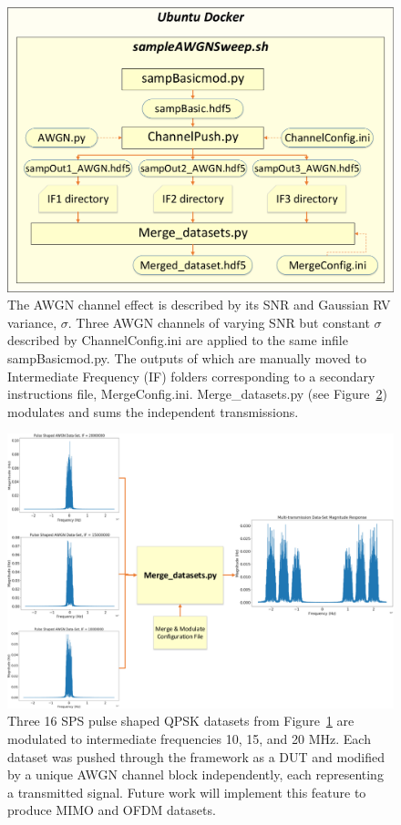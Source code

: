 \begin{figure}[ht!]
\centering	\includegraphics[width=1\textwidth,keepaspectratio]{figs/bashcmd_poster.eps}
    \caption{The AWGN channel effect is described by its SNR and Gaussian RV variance, $\sigma$. Three AWGN channels of varying SNR but constant $\sigma$ described by ChannelConfig.ini are applied to the same infile sampBasicmod.py. The outputs of which are manually moved to Intermediate Frequency (IF) folders corresponding to a secondary instructions file, MergeConfig.ini. Merge\_datasets.py (see Figure~\ref{fig:merge/}) modulates and sums the independent transmissions.} 
\label{fig:bashcmd_poster/}      
\end{figure}

\begin{figure}[ht!]
	\centering	\includegraphics[width=1\textwidth,keepaspectratio]{figs/merge_flow.eps}
    \caption{Three 16 SPS pulse shaped QPSK datasets from Figure~\ref{fig:bashcmd_poster/} are modulated to intermediate frequencies 10, 15, and 20 MHz. Each dataset was pushed through the framework as a DUT and modified by a unique AWGN channel block independently, each representing a transmitted signal. Future work will implement this feature to produce MIMO and OFDM datasets.} 
\label{fig:merge/}      
\end{figure}


